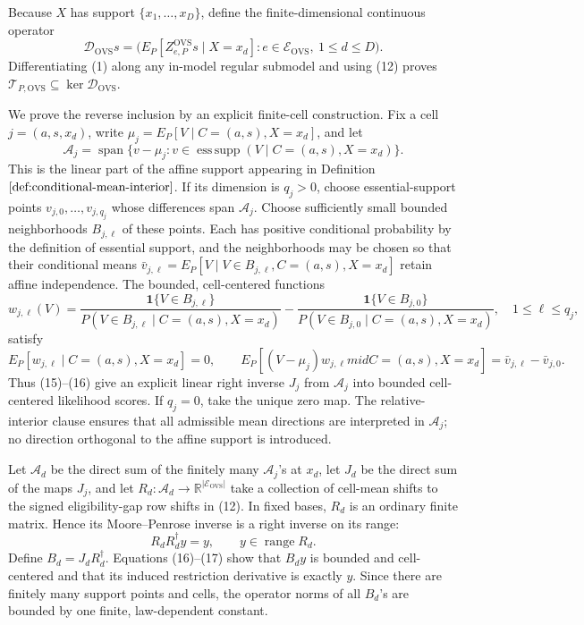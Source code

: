 Because \(X\) has support \(\{x_1,\ldots,x_D\}\), define the finite-dimensional continuous operator
\[
\mathscr D_{\mathrm{OVS}}s
=\bigl(E_P[Z^{\mathrm{OVS}}_{e,P}s\mid X=x_d]
 :e\in\mathcal E_{\mathrm{OVS}},\ 1\le d\le D\bigr).
\tag{13}
\]
Differentiating (1) along any in-model regular submodel and using (12) proves
\(\mathcal T_{P,\mathrm{OVS}}\subseteq\ker\mathscr D_{\mathrm{OVS}}\).

We prove the reverse inclusion by an explicit finite-cell construction.  Fix a cell \(j=(a,s,x_d)\), write \(\mu_j=E_P[V\mid C=(a,s),X=x_d]\), and let
\[
\mathcal A_j=\operatorname{span}\{v-\mu_j:v\in
\operatorname{ess\,supp}(V\mid C=(a,s),X=x_d)\}.
\tag{14}
\]
This is the linear part of the affine support appearing in Definition \(\ref{def:conditional-mean-interior}\).  If its dimension is \(q_j>0\), choose essential-support points \(v_{j,0},\ldots,v_{j,q_j}\) whose differences span \(\mathcal A_j\).  Choose sufficiently small bounded neighborhoods \(B_{j,\ell}\) of these points.  Each has positive conditional probability by the definition of essential support, and the neighborhoods may be chosen so that their conditional means \(\bar v_{j,\ell}=E_P[V\mid V\in B_{j,\ell},C=(a,s),X=x_d]\) retain affine independence.  The bounded, cell-centered functions
\[
w_{j,\ell}(V)=
\frac{\mathbf 1\{V\in B_{j,\ell}\}}
{P(V\in B_{j,\ell}\mid C=(a,s),X=x_d)}
-
\frac{\mathbf 1\{V\in B_{j,0}\}}
{P(V\in B_{j,0}\mid C=(a,s),X=x_d)},
\quad 1\le\ell\le q_j,
\tag{15}
\]
satisfy
\[
E_P[w_{j,\ell}\mid C=(a,s),X=x_d]=0,
\qquad
E_P[(V-\mu_j)w_{j,\ell}mid C=(a,s),X=x_d]
=\bar v_{j,\ell}-\bar v_{j,0}.
\tag{16}
\]
Thus (15)--(16) give an explicit linear right inverse \(J_j\) from \(\mathcal A_j\) into bounded cell-centered likelihood scores.  If \(q_j=0\), take the unique zero map.  The relative-interior clause ensures that all admissible mean directions are interpreted in \(\mathcal A_j\); no direction orthogonal to the affine support is introduced.

Let \(\mathcal A_d\) be the direct sum of the finitely many \(\mathcal A_j\)'s at \(x_d\), let \(J_d\) be the direct sum of the maps \(J_j\), and let \(R_d:\mathcal A_d\to\mathbb R^{|\mathcal E_{\mathrm{OVS}}|}\) take a collection of cell-mean shifts to the signed eligibility-gap row shifts in (12).  In fixed bases, \(R_d\) is an ordinary finite matrix.  Hence its Moore--Penrose inverse is a right inverse on its range:
\[
R_dR_d^\dagger y=y,
\qquad y\in\operatorname{range}R_d.
\tag{17}
\]
Define \(B_d=J_dR_d^\dagger\).  Equations (16)--(17) show that \(B_dy\) is bounded and cell-centered and that its induced restriction derivative is exactly \(y\).  Since there are finitely many support points and cells, the operator norms of all \(B_d\)'s are bounded by one finite, law-dependent constant.

